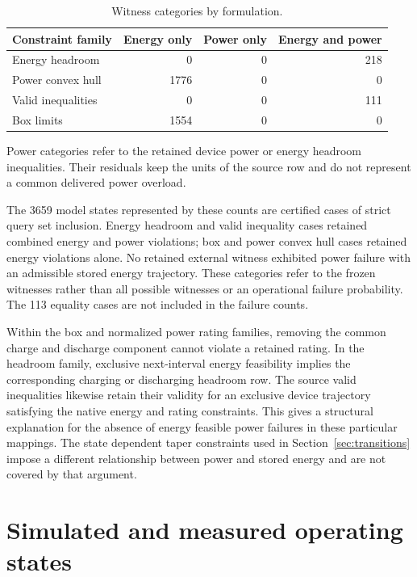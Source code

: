 \begin{table}[htbp]
\caption{Witness categories by formulation.}\label{tab:residual_family_witnesses}
\begin{tabular}{@{}l r r r@{}}
\toprule
Constraint family & Energy only & Power only & Energy and power\\
\midrule
Energy headroom & 0 & 0 & 218 \\
Power convex hull & 1776 & 0 & 0 \\
Valid inequalities & 0 & 0 & 111 \\
Box limits & 1554 & 0 & 0 \\
\bottomrule
\end{tabular}
\par\smallskip
\begin{minipage}{\linewidth}
Power categories refer to the retained device power or energy headroom
inequalities. Their residuals keep the units of the source row and do not
represent a common delivered power overload.
\end{minipage}
\end{table}

The 3659 model states represented by these counts are certified cases of strict
query set inclusion. Energy headroom and valid inequality cases retained
combined energy and power violations; box and power convex hull cases
retained energy violations alone. No retained external witness exhibited
power failure with an admissible stored energy trajectory. These categories
refer to the frozen witnesses rather than all possible witnesses or an
operational failure probability. The 113 equality cases are not included
in the failure counts.



Within the box and normalized power rating families, removing the common
charge and discharge component cannot violate a retained rating. In the
headroom family, exclusive next-interval energy feasibility implies the
corresponding charging or discharging headroom row. The source valid
inequalities likewise retain their validity for an exclusive device
trajectory satisfying the native energy and rating constraints. This gives
a structural explanation for the absence of energy feasible power failures
in these particular mappings. The state dependent taper constraints used in
Section~\ref{sec:transitions} impose a different relationship between power
and stored energy and are not covered by that argument.


\section{Simulated and measured operating states}\label{sec:operating_states}
